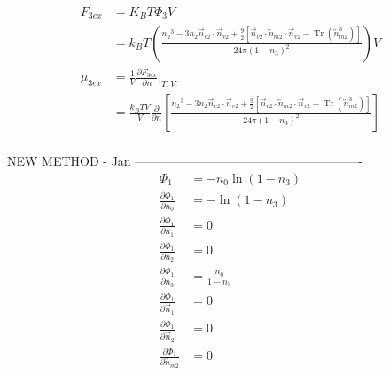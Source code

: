 \documentclass[double,12pt]{revtex4-2}
\begin{document}
\begin{align}
    F_{3ex} &= K_BT\Phi_3 V  \\
            &= k_BT\left(\frac{{n_2}^3-3n_2\vec n_{v2}\cdot\vec n_{v2}+\frac{9}{2}
       \left[\vec n_{v2}\cdot{\overleftrightarrow{n}_{m2}}\cdot{\vec n_{v2}}
       -\operatorname{Tr}({\overleftrightarrow n^3_{m2}})\right]}{24\pi(1-n_3)^2} \right)V  \\
%       
       \mu_{3ex} &= \frac{1}{V}\frac{\partial F_{3ex}}{\partial n} \bigg|_{T,V} \\
         &= \frac{k_BTV}{V} \frac{\partial}{\partial n}\left[
       \frac{{n_2}^3-3n_2\vec n_{v2}\cdot\vec n_{v2}+\frac{9}{2}
       [\vec n_{v2}\cdot{\overleftrightarrow{n}_{m2}}\cdot{\vec n_{v2}}
       -\operatorname{Tr}({\overleftrightarrow n^3_{m2}})]}{24\pi(1-n_3)^2}\right]  \\       
\end{align} 

NEW METHOD - Jan -------------------------------------------------------
\begin{align}
  \Phi_1 &= -n_0\ln\left(1-n_3\right)                            \\
  \frac{\partial \Phi_1}{\partial n_0} &= -\ln\left(1-n_3\right) \\
  \frac{\partial \Phi_1}{\partial n_1} &= 0                      \\
  \frac{\partial \Phi_1}{\partial n_2} &= 0                      \\
  \frac{\partial \Phi_1}{\partial n_3} &= \frac{n_0}{1-n_3}      \\
  \frac{\partial \Phi_1}{\partial \vec n_1} &= 0                 \\
  \frac{\partial \Phi_1}{\partial \vec n_2} &= 0                 \\
  \frac{\partial \Phi_1}{\partial \overleftrightarrow  n_{m2}} &= 0   \\
\end{align} 
\end{document}
